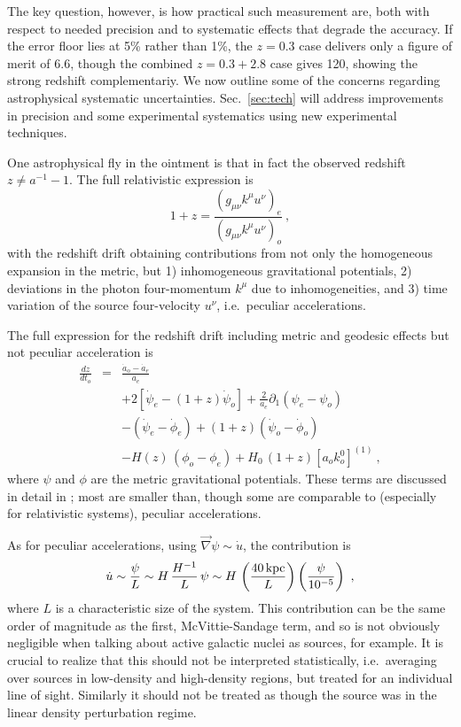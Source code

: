 \documentclass[preprint2, 10pt]{aastex}
\newcommand{\be}{\begin{equation}}
\newcommand{\ee}{\end{equation}}
\newcommand{\bea}{\begin{eqnarray}}
\newcommand{\eea}{\end{eqnarray}}
\begin{document}
The key question, however, is how practical such measurement are, both 
with respect to needed precision and to systematic effects that degrade 
the accuracy. If the error floor lies at 5\% rather than 1\%, the $z=0.3$ 
case delivers only a figure of merit of 6.6, though the combined $z=0.3+2.8$ 
case gives 120, showing the strong redshift complementariy. We now outline 
some of the 
concerns regarding astrophysical systematic uncertainties. Sec.~\ref{sec:tech} 
will address improvements in precision and some experimental systematics 
using new experimental techniques. 

One astrophysical fly in the ointment is that in fact the observed redshift 
$z\ne a^{-1}-1$. The full relativistic expression is 
\be 
1+z=\frac{(g_{\mu\nu}k^\mu u^\nu)_e}{(g_{\mu\nu}k^\mu u^\nu)_o}\ , 
\label{eq:zgen} 
\ee 
with the redshift drift obtaining contributions from not only the 
homogeneous expansion in the metric, but 1) inhomogeneous gravitational 
potentials, 2) deviations in the photon four-momentum $k^\mu$ due to 
inhomogeneities, and 3) time variation of the source four-velocity $u^\nu$, 
i.e.\ peculiar accelerations.  

The full expression for the redshift drift including metric and geodesic 
effects but not peculiar acceleration is 
\bea 
\frac{dz}{dt_o}&=&\frac{\dot a_o-\dot a_e}{a_e}\\ 
&&+2[\dot\psi_e-(1+z)\dot\psi_o]
+\frac{2}{a_e}\partial_1(\psi_e-\psi_o)\nonumber\\ 
&&-(\dot\psi_e-\dot\phi_e)+(1+z)(\dot\psi_o-\dot\phi_o)\nonumber\\ 
&&-H(z)\,(\phi_o-\phi_e)+H_0\,(1+z)[a_o k^0_o]^{(1)}\ ,\nonumber  
\eea 
where $\psi$ and $\phi$ are the metric gravitational potentials. 
These terms are discussed in detail in \citet{10044646}; most are smaller 
than, though some are comparable to (especially for relativistic systems), 
peculiar accelerations. 

As for peculiar accelerations, using 
$\vec\nabla\psi\sim \dot u$, the contribution is 
\be 
\dot u \sim \frac{\psi}{L}\sim H\,\frac{H^{-1}}{L}\,\psi\sim H\, 
\left(\frac{40\,{\rm kpc}}{L}\right)\left(\frac{\psi}{10^{-5}}\right)\ , 
\ee 
where $L$ is a characteristic size of the system.  This contribution can be 
the same order of magnitude as the first, McVittie-Sandage term, and so is 
not obviously negligible when talking about active galactic nuclei as 
sources, for example. It is crucial to realize that this should not be 
interpreted statistically, i.e.\ averaging over sources in low-density 
and high-density regions, but treated for an individual line of sight. 
Similarly it should not be treated as though the source was in the linear 
density perturbation regime. 
\end{document}
